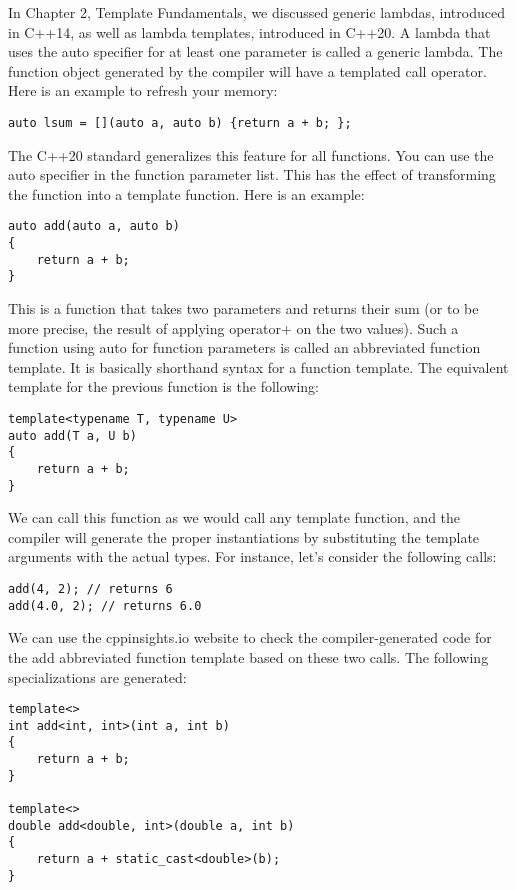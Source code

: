 In Chapter 2, Template Fundamentals, we discussed generic lambdas, introduced in C++14, as well as lambda templates, introduced in C++20. A lambda that uses the auto specifier for at least one parameter is called a generic lambda. The function object generated by the compiler will have a templated call operator. Here is an example to refresh your memory:

\begin{lstlisting}[style=styleCXX]
auto lsum = [](auto a, auto b) {return a + b; };
\end{lstlisting}

The C++20 standard generalizes this feature for all functions. You can use the auto specifier in the function parameter list. This has the effect of transforming the function into a template function. Here is an example:

\begin{lstlisting}[style=styleCXX]
auto add(auto a, auto b)
{
	return a + b;
}
\end{lstlisting}

This is a function that takes two parameters and returns their sum (or to be more precise, the result of applying operator+ on the two values). Such a function using auto for function parameters is called an abbreviated function template. It is basically shorthand syntax for a function template. The equivalent template for the previous function is the following:

\begin{lstlisting}[style=styleCXX]
template<typename T, typename U>
auto add(T a, U b)
{
	return a + b;
}
\end{lstlisting}

We can call this function as we would call any template function, and the compiler will generate the proper instantiations by substituting the template arguments with the actual types. For instance, let’s consider the following calls:

\begin{lstlisting}[style=styleCXX]
add(4, 2); // returns 6
add(4.0, 2); // returns 6.0
\end{lstlisting}

We can use the cppinsights.io website to check the compiler-generated code for the add abbreviated function template based on these two calls. The following specializations are generated:

\begin{lstlisting}[style=styleCXX]
template<>
int add<int, int>(int a, int b)
{
	return a + b;
}

template<>
double add<double, int>(double a, int b)
{
	return a + static_cast<double>(b);
}
\end{lstlisting}

